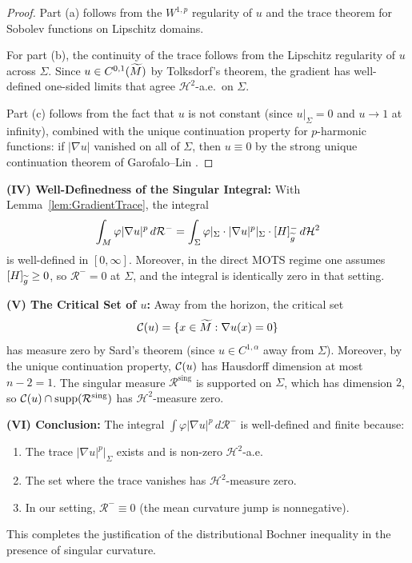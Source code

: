 \begin{remark}
\begin{proof}
Part (a) follows from the $W^{1,p}$ regularity of $u$ and the trace theorem for Sobolev functions on Lipschitz domains.

For part (b), the continuity of the trace follows from the Lipschitz regularity of $u$ across $\Sigma$. Since $u \in C^{0,1}(\widetilde{M})$ by Tolksdorf's theorem, the gradient has well-defined one-sided limits that agree $\mathcal{H}^2$-a.e.\ on $\Sigma$.

Part (c) follows from the fact that $u$ is not constant (since $u|_\Sigma = 0$ and $u \to 1$ at infinity), combined with the unique continuation property for $p$-harmonic functions: if $|\nabla u|$ vanished on all of $\Sigma$, then $u \equiv 0$ by the strong unique continuation theorem of Garofalo--Lin \cite{garofalolin1987}.
\end{proof}

\textbf{(IV) Well-Definedness of the Singular Integral:}
With Lemma~\ref{lem:GradientTrace}, the integral
\begin{equation}
    \int_M \varphi |\nabla u|^p \, d\mathcal{R}^- = \int_\Sigma \varphi|_\Sigma \cdot |\nabla u|^p|_\Sigma \cdot [H]_{\widetilde{g}}^- \, d\mathcal{H}^2
\end{equation}
is well-defined in $[0, \infty]$. Moreover, in the direct MOTS regime one assumes $[H]_{\widetilde{g}} \ge 0$, so $\mathcal{R}^- = 0$ at $\Sigma$, and the integral is identically zero in that setting.

\textbf{(V) The Critical Set of $u$:}
Away from the horizon, the critical set
\begin{equation}
    \mathcal{C}(u) = \{x \in \widetilde{M} : \nabla u(x) = 0\}
\end{equation}
has measure zero by Sard's theorem (since $u \in C^{1,\alpha}$ away from $\Sigma$). Moreover, by the unique continuation property, $\mathcal{C}(u)$ has Hausdorff dimension at most $n-2 = 1$. The singular measure $\mathcal{R}^{\text{sing}}$ is supported on $\Sigma$, which has dimension $2$, so $\mathcal{C}(u) \cap \mathrm{supp}(\mathcal{R}^{\text{sing}})$ has $\mathcal{H}^2$-measure zero.

\textbf{(VI) Conclusion:}
The integral $\int \varphi |\nabla u|^p \, d\mathcal{R}^-$ is well-defined and finite because:
\begin{enumerate}
    \item The trace $|\nabla u|^p|_\Sigma$ exists and is non-zero $\mathcal{H}^2$-a.e.
    \item The set where the trace vanishes has $\mathcal{H}^2$-measure zero.
    \item In our setting, $\mathcal{R}^- \equiv 0$ (the mean curvature jump is nonnegative).
\end{enumerate}
This completes the justification of the distributional Bochner inequality in the presence of singular curvature.
\end{remark}

